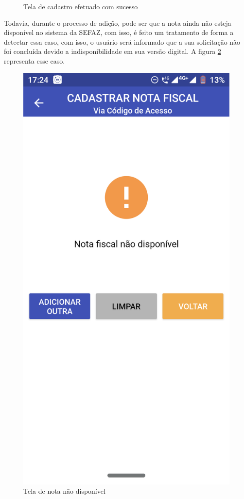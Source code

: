 \begin{figure}[h]
    \caption{Tela de cadastro efetuado com sucesso}
    \label{appQRCodeSucessoFig}
\end{figure}

\newpage
Todavia, durante o processo de adição, pode ser que a nota ainda não esteja disponível no sistema da SEFAZ, com isso, é feito um tratamento de forma a detectar essa caso, com isso, o usuário será informado que a sua solicitação não foi concluída devido a indisponibilidade em sua versão digital. A figura \ref{appQRCodeNaoDisponivelFig} representa esse caso.

\begin{figure}[h]
    \centering
    \includegraphics[scale=0.15]{tcc/figures/app/app_codigo_acesso_nao_disponivel.png}
    \caption{Tela de nota não disponível}
    \label{appQRCodeNaoDisponivelFig}
\end{figure}

